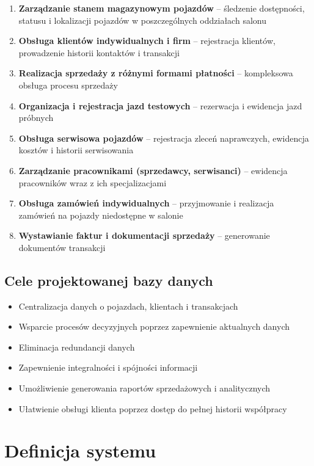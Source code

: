 \documentclass[a4paper,titleauthor]{mwart}
\begin{document}
	\begin{enumerate}
		\item \textbf{Zarządzanie stanem magazynowym pojazdów} -- śledzenie dostępności, statusu i lokalizacji pojazdów w poszczególnych oddziałach salonu
		\item \textbf{Obsługa klientów indywidualnych i firm} -- rejestracja klientów, prowadzenie historii kontaktów i transakcji
		\item \textbf{Realizacja sprzedaży z różnymi formami płatności} -- kompleksowa obsługa procesu sprzedaży
		\item \textbf{Organizacja i rejestracja jazd testowych} -- rezerwacja i ewidencja jazd próbnych
		\item \textbf{Obsługa serwisowa pojazdów} -- rejestracja zleceń naprawczych, ewidencja kosztów i historii serwisowania
		\item \textbf{Zarządzanie pracownikami (sprzedawcy, serwisanci)} -- ewidencja pracowników wraz z ich specjalizacjami
		\item \textbf{Obsługa zamówień indywidualnych} -- przyjmowanie i realizacja zamówień na pojazdy niedostępne w salonie
		\item \textbf{Wystawianie faktur i dokumentacji sprzedaży} -- generowanie dokumentów transakcji
	\end{enumerate}
	
	\subsection{Cele projektowanej bazy danych}
	
	\begin{itemize}
		\item Centralizacja danych o pojazdach, klientach i transakcjach
		\item Wsparcie procesów decyzyjnych poprzez zapewnienie aktualnych danych
		\item Eliminacja redundancji danych
		\item Zapewnienie integralności i spójności informacji
		\item Umożliwienie generowania raportów sprzedażowych i analitycznych
		\item Ułatwienie obsługi klienta poprzez dostęp do pełnej historii współpracy
	\end{itemize}
	
	\section{Definicja systemu}
	
\end{document}
